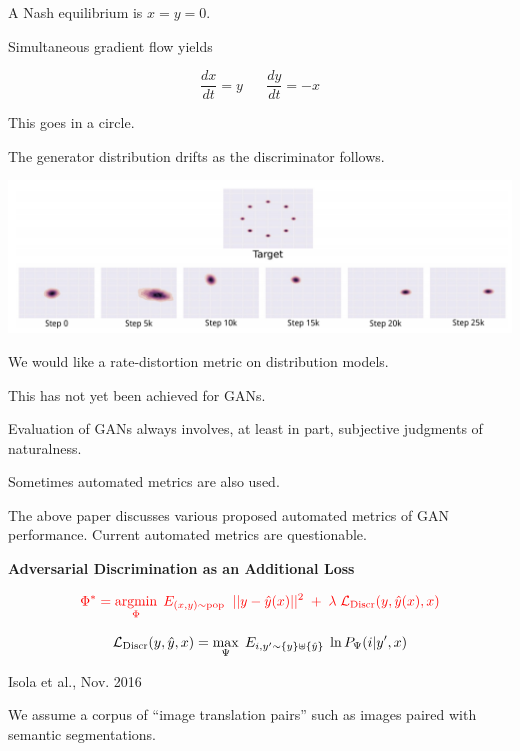 {\vfill
A Nash equilibrium is $x= y = 0$.

\vfill
Simultaneous gradient flow yields

{\color{red} $$\frac{dx}{dt}  =  y \;\;\;\;\;\;\frac{dy}{dt} = -x$$}

\vfill
This goes in a circle.


The generator distribution drifts as the discriminator follows.

\centerline{\includegraphics[width=9in]{../images/Unstable1}}


We would like a rate-distortion metric on distribution models.

\vfill
This has not yet been achieved for GANs.

\vfill
Evaluation of GANs always involves, at least in part, subjective judgments of naturalness.

\vfill
Sometimes automated metrics are also used.

\vfill
The above paper discusses various proposed automated metrics of GAN performance.  Current automated metrics are questionable.

\slide{}

\centerline{\bf Adversarial Discrimination as an Additional Loss}

\vfill
\vfill


$${\color{red} \Phi^* = \operatorname*{argmin}_\Phi\;E_{(x,y) \sim \mathrm{pop}}\;\; ||y - \hat{y}(x)||^2\; +\; \lambda\; {\cal L}_{\mathrm{Discr}}(y,\hat{y}(x),x)}$$

\vfill
$${\cal L}_{\mathrm{Discr}}(y,\hat{y},x) = \max_\Psi \;E_{i,y' \sim \{y\}\uplus \{\hat{y}\}}\; \ln P_\Psi(i|y',x)$$

{Isola et al., Nov. 2016}

We assume a corpus of ``image translation pairs'' such as images paired with semantic segmentations.

}
